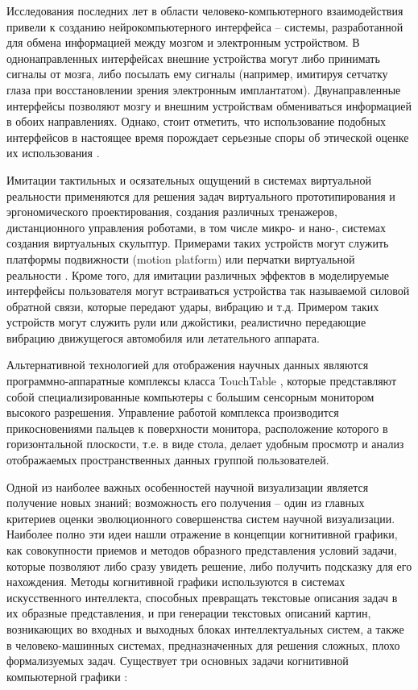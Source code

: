 Исследования последних лет в области человеко-компьютерного взаимодействия привели к созданию нейрокомпьютерного интерфейса \citep{dk56}\citep{dk57}\citep{dk58} – системы, разработанной для обмена информацией между мозгом и электронным устройством. В однонаправленных интерфейсах внешние устройства могут либо принимать сигналы от мозга, либо посылать ему сигналы (например, имитируя сетчатку глаза при восстановлении зрения электронным имплантатом). Двунаправленные интерфейсы позволяют мозгу и внешним устройствам обмениваться информацией в обоих направлениях. Однако, стоит отметить, что использование подобных интерфейсов в настоящее время порождает серьезные споры об этической оценке их использования \citep{dk59}\citep{dk60}.

Имитации тактильных и осязательных ощущений в системах виртуальной реальности применяются для решения задач виртуального прототипирования и эргономического проектирования, создания различных тренажеров, дистанционного управления роботами, в том числе микро- и нано-, системах создания виртуальных скульптур. Примерами таких устройств могут служить платформы подвижности (motion platform) \citep{dk61} или перчатки виртуальной реальности \citep{dk62}. Кроме того, для имитации различных эффектов в моделируемые интерфейсы пользователя могут встраиваться устройства так называемой силовой обратной связи, которые передают удары, вибрацию и т.д. Примером таких устройств могут служить рули или джойстики, реалистично передающие вибрацию движущегося автомобиля или летательного аппарата.

Альтернативной технологией для отображения научных данных являются программно-аппаратные комплексы класса TouchTable \citep{dk63}\citep{dk64}, которые представляют собой специализированные компьютеры с большим сенсорным монитором высокого разрешения. Управление работой комплекса производится прикосновениями пальцев к поверхности монитора, расположение которого в горизонтальной плоскости, т.е. в виде стола, делает удобным просмотр и анализ отображаемых пространственных данных группой пользователей.

Одной из наиболее важных особенностей научной визуализации является получение новых знаний; возможность его получения – один из главных критериев оценки эволюционного совершенства систем научной визуализации. Наиболее полно эти идеи нашли отражение в концепции когнитивной графики, как совокупности приемов и методов образного представления условий задачи, которые позволяют либо сразу увидеть решение, либо получить подсказку для его нахождения. Методы когнитивной графики используются в системах искусственного интеллекта, способных превращать текстовые описания задач в их образные представления, и при генерации текстовых описаний картин, возникающих во входных и выходных блоках интеллектуальных систем, а также в человеко-машинных системах, предназначенных для решения сложных, плохо формализуемых задач. Существует три основных задачи когнитивной компьютерной графики \citep{dk65}:

